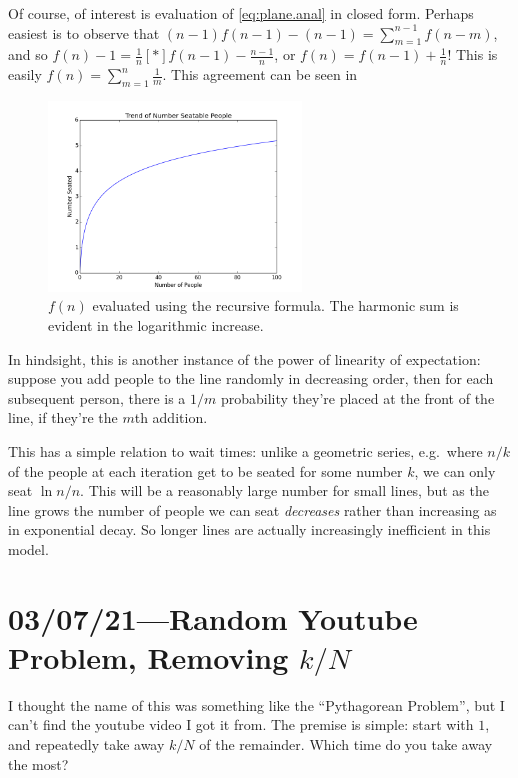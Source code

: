 \documentclass[12pt]{report}
\newcommand*{\s}[1]{\left[#1\right]}
\begin{document}
Of course, of interest is evaluation of \autoref{eq:plane.anal} in closed form.
Perhaps easiest is to observe that $(n - 1)f(n - 1) - (n - 1) = \sum\limits_{m =
1}^{n - 1}f(n - m)$, and so $f(n) - 1 = \frac{1}{n}\s*{f(n - 1) - \frac{n -
1}{n}}$, or $f(n) = f(n - 1) + \frac{1}{n}$! This is easily $f(n) =
\sum\limits_{m = 1}^n \frac{1}{m}$. This agreement can be seen in
\begin{figure}[t]
    \centering
    \includegraphics[width=0.6\textwidth]{plane_boarding/seating_trend.png}
    \caption{$f(n)$ evaluated using the recursive formula. The harmonic sum is
    evident in the logarithmic increase.}\label{fig:plane.trend}
\end{figure}

In hindsight, this is another instance of the power of linearity of expectation:
suppose you add people to the line randomly in decreasing order, then for each
subsequent person, there is a $1/m$ probability they're placed at the front of
the line, if they're the $m$th addition.

This has a simple relation to wait times: unlike a geometric series, e.g.\ where
$n/k$ of the people at each iteration get to be seated for some number $k$, we
can only seat $\ln n / n$. This will be a reasonably large number for small
lines, but as the line grows the number of people we can seat \emph{decreases}
rather than increasing as in exponential decay. So longer lines are actually
increasingly inefficient in this model.

\chapter{03/07/21---Random Youtube Problem, Removing $k / N$}

I thought the name of this was something like the ``Pythagorean Problem'', but I
can't find the youtube video I got it from. The premise is simple: start with
$1$, and repeatedly take away $k / N$ of the remainder. Which time
do you take away the most?
\end{document}
